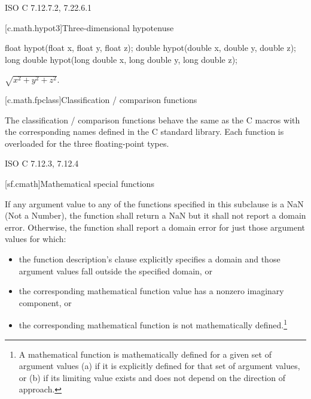 \xref ISO C 7.12.7.2, 7.22.6.1

[c.math.hypot3]{Three-dimensional hypotenuse}

%
\begin{itemdecl}
float hypot(float x, float y, float z);
double hypot(double x, double y, double z);
long double hypot(long double x, long double y, long double z);
\end{itemdecl}

\begin{itemdescr}
\pnum
\returns $\sqrt{x^2+y^2+z^2}$.
\end{itemdescr}

[c.math.fpclass]{Classification / comparison functions}

\pnum
The classification / comparison functions behave the same as the C macros with the
corresponding names defined in the C standard library.
Each function is overloaded for the three floating-point types.

\xref
ISO C 7.12.3, 7.12.4

[sf.cmath]{Mathematical special functions}%
%

\pnum{}%
If any argument value
to any of the functions specified in this subclause
is a NaN (Not a Number),
the function shall return a NaN
but it shall not report a domain error.
Otherwise,
the function shall report a domain error
for just those argument values
for which:

\begin{itemize}
  \item
  the function description's \returns clause
  explicitly specifies a domain
  and those argument values fall
  outside the specified domain,
  or

  \item
  the corresponding mathematical function value
  has a nonzero imaginary component,
  or

  \item
  the corresponding mathematical function
  is not mathematically defined.\footnote{%
    A mathematical function
    is mathematically defined
    for a given set of argument values
    (a)
      if it is explicitly defined
      for that set of argument values,
      or
    (b)
      if its limiting value exists
      and does not depend
      on the direction of approach.}
\end{itemize}

